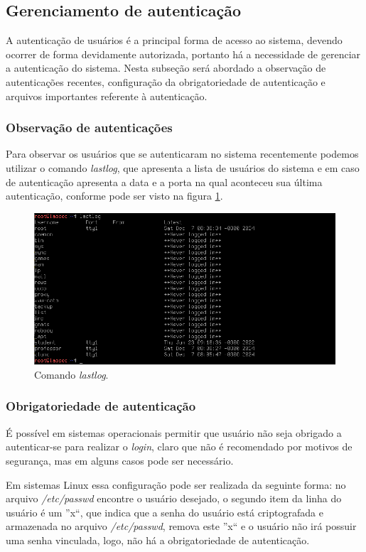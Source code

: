\documentclass[
	12pt,				%
	oneside,   	        %
	a4paper,			%
	english,			%
	french,				%
	spanish,			%
	brazil,				%
	]{pacotes/abntex2}
\begin{document}
\subsection{Gerenciamento de autenticação}
A autenticação de usuários é a principal forma de acesso ao sistema, devendo ocorrer de forma devidamente autorizada, portanto há a necessidade de gerenciar a autenticação do sistema. Nesta subseção será abordado a observação de autenticações recentes, configuração da obrigatoriedade de autenticação e arquivos importantes referente à autenticação.

\subsubsection{Observação de autenticações}
Para observar os usuários que se autenticaram no sistema recentemente podemos utilizar o comando \textit{lastlog}, que apresenta a lista de usuários do sistema e em caso de autenticação apresenta a data e a porta na qual aconteceu sua última autenticação, conforme pode ser visto na figura \ref{fig:lastlogs}.

\begin{figure}[H]
  \centering
  \includegraphics[scale=0.7]{figuras/lastlog.png}
  \caption{Comando \textit{lastlog}.}
  \label{fig:lastlogs}
\end{figure}

\subsubsection{Obrigatoriedade de autenticação}
\label{subsubsec:passwd_root}
É possível em sistemas operacionais permitir que usuário não seja obrigado a autenticar-se para realizar o \textit{login}, claro que não é recomendado por motivos de segurança, mas em alguns casos pode ser necessário.

Em sistemas Linux essa configuração pode ser realizada da seguinte forma: no arquivo \textit{/etc/passwd} encontre o usuário desejado, o segundo item da linha do usuário é um ''x``, que indica que a senha do usuário está criptografada e armazenada no arquivo \textit{/etc/passwd}, remova este ''x`` e o usuário não irá possuir uma senha vinculada, logo, não há a obrigatoriedade de autenticação.
\end{document}
